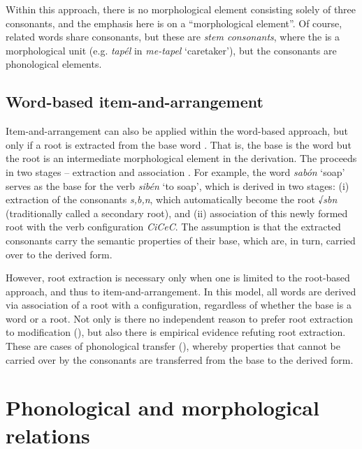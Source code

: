 \documentclass[output=paper,
modfonts
]{LSP/langsci}
\begin{document}
	Within this approach, there is no morphological element consisting
	solely of three consonants, and the emphasis here is on a ``morphological
	element''. Of course, related words share consonants, but these are
	\emph{stem consonants}, where the  is a morphological unit (e.g.
	\emph{tapél} in \emph{me-tapel} `caretaker'), but the consonants are
	phonological elements.
	
	\subsection{Word-based item-and-arrangement}\label{word-based-item-and-arrangement}\label{sec:batel:2.3}
	Item-and-arrangement can also be applied within the word-based approach,
but only if a root is extracted from the base word \citep{ornan1983a, bolozky1978a}. That is, the base is the word but the root is an intermediate
morphological element in the derivation. The  proceeds in two
stages -- extraction and association \citep{batel1986a, batel1989a}. For example,
the word \emph{sabón} `soap' serves as the base for the verb
\emph{sibén} `to soap', which is derived in two stages: (i) extraction
of the consonants \emph{s,b,n}, which automatically become the root
√\emph{sbn} (traditionally called a secondary root), and (ii)
association of this newly formed root with the verb configuration
\emph{CiCeC}. The assumption is that the extracted consonants carry the
semantic properties of their base, which are, in turn, carried over to
the derived form.

However, root extraction is necessary only when one is limited to the
root-based approach, and thus to item-and-arrangement. In this model,
all words are derived via association of a root with a configuration,
regardless of whether the base is a word or a root. Not only is there no
independent reason to prefer root extraction to  modification
(), but also there is empirical evidence refuting root extraction. These
are cases of phonological transfer (), whereby properties that
cannot be carried over by the consonants are transferred from the base
to the derived form.

\section{Phonological and morphological
relations}\label{phonological-and-morphological-relations}\label{sec:batel:3}
\end{document}

